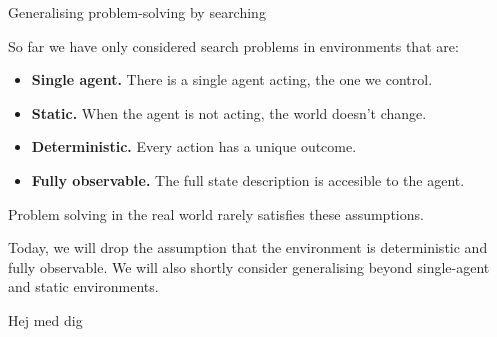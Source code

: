 \documentclass[aspectratio=169,hyperref={pdfpagelabels=false}]{beamer}
\begin{document}
\begin{frame}{Generalising problem-solving by searching}

    So far we have only considered search problems in environments that are:
    \begin{itemize}
        \item \textbf{Single agent.} There is a single agent acting, the one we control.
        \item \textbf{Static.} When the agent is not acting, the world doesn't change.
        \item \textbf{Deterministic.} Every action has a unique outcome.
        \item \textbf{Fully observable.} The full state description is accesible to the agent.
    \end{itemize}
    Problem solving in the real world rarely satisfies these assumptions.

    Today, we will drop the assumption that the environment is deterministic and fully observable. We will also shortly consider generalising beyond single-agent and static environments.

\end{frame}

\begin{frame}{Hej}
    med dig
\end{frame}
\end{document}
